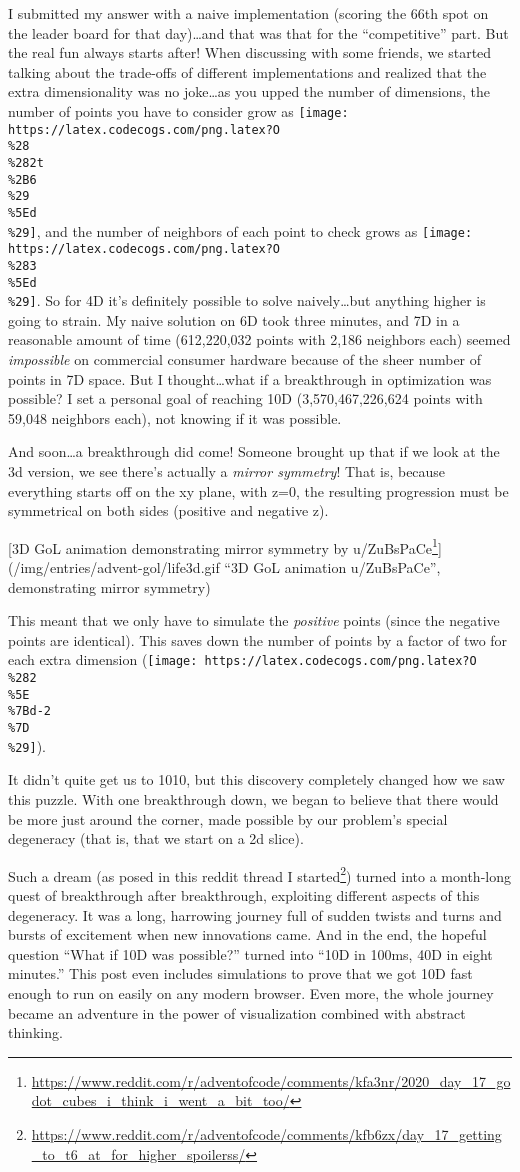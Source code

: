 \documentclass[]{article}
\renewcommand{\href}[2]{#2\footnote{\url{#1}}}
\begin{document}
I submitted my answer with a naive implementation (scoring the 66th spot on the
leader board for that day)\ldots and that was that for the ``competitive'' part.
But the real fun always starts after! When discussing with some friends, we
started talking about the trade-offs of different implementations and realized
that the extra dimensionality was no joke\ldots as you upped the number of
dimensions, the number of points you have to consider grow as
\texttt{[image: https://latex.codecogs.com/png.latex?O\\\%28\\\%282t\\\%2B6\\\%29\\\%5Ed\\\%29]},
and the number of neighbors of each point to check grows as
\texttt{[image: https://latex.codecogs.com/png.latex?O\\\%283\\\%5Ed\\\%29]}. So for
4D it's definitely possible to solve naively\ldots but anything higher is going
to strain. My naive solution on 6D took three minutes, and 7D in a reasonable
amount of time (612,220,032 points with 2,186 neighbors each) seemed
\emph{impossible} on commercial consumer hardware because of the sheer number of
points in 7D space. But I thought\ldots what if a breakthrough in optimization
was possible? I set a personal goal of reaching 10D (3,570,467,226,624 points
with 59,048 neighbors each), not knowing if it was possible.

And soon\ldots a breakthrough did come! Someone brought up that if we look at
the 3d version, we see there's actually a \emph{mirror symmetry}! That is,
because everything starts off on the xy plane, with z=0, the resulting
progression must be symmetrical on both sides (positive and negative z).

{[}3D GoL animation demonstrating mirror symmetry by
\href{https://www.reddit.com/r/adventofcode/comments/kfa3nr/2020_day_17_godot_cubes_i_think_i_went_a_bit_too/}{u/ZuBsPaCe}{]}(/img/entries/advent-gol/life3d.gif
``3D GoL animation u/ZuBsPaCe'', demonstrating mirror symmetry)

This meant that we only have to simulate the \emph{positive} points (since the
negative points are identical). This saves down the number of points by a factor
of two for each extra dimension
(\texttt{[image: https://latex.codecogs.com/png.latex?O\\\%282\\\%5E\\\%7Bd-2\\\%7D\\\%29]}).

It didn't quite get us to 1010, but this discovery completely changed how we saw
this puzzle. With one breakthrough down, we began to believe that there would be
more just around the corner, made possible by our problem's special degeneracy
(that is, that we start on a 2d slice).

Such a dream (as posed in
\href{https://www.reddit.com/r/adventofcode/comments/kfb6zx/day_17_getting_to_t6_at_for_higher_spoilerss/}{this
reddit thread I started}) turned into a month-long quest of breakthrough after
breakthrough, exploiting different aspects of this degeneracy. It was a long,
harrowing journey full of sudden twists and turns and bursts of excitement when
new innovations came. And in the end, the hopeful question ``What if 10D was
possible?'' turned into ``10D in 100ms, 40D in eight minutes.'' This post even
includes simulations to prove that we got 10D fast enough to run on easily on
any modern browser. Even more, the whole journey became an adventure in the
power of visualization combined with abstract thinking.
\end{document}
